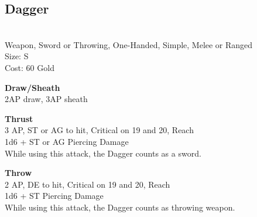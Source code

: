 \subsection{Dagger}\label{weapon:dagger}\\
Weapon, Sword or Throwing, One-Handed, Simple, Melee or Ranged\\
Size: S\\
Cost: 60 Gold

\textbf{Draw/Sheath}\\
2AP draw, 3AP sheath

\textbf{Thrust} \\
3 AP, ST or AG to hit, Critical on 19 and 20,  Reach\\
1d6 + \texttimes ST or AG Piercing Damage\\
While using this attack, the Dagger counts as a sword.

\textbf{Throw} \\
2 AP, DE to hit, Critical on 19 and 20,  Reach\\
1d6 + \texttimes ST Piercing Damage\\
While using this attack, the Dagger counts as throwing weapon.

